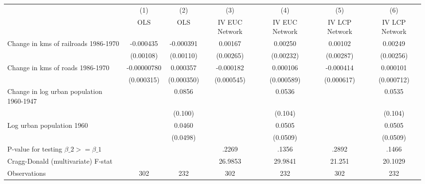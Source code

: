 {
\def\sym#1{\ifmmode^{#1}\else\(^{#1}\)\fi}
\begin{tabular}{l*{6}{c}}
\hline\hline
                &\multicolumn{1}{c}{(1)}&\multicolumn{1}{c}{(2)}&\multicolumn{1}{c}{(3)}&\multicolumn{1}{c}{(4)}&\multicolumn{1}{c}{(5)}&\multicolumn{1}{c}{(6)}\\
                &\multicolumn{1}{c}{OLS}&\multicolumn{1}{c}{OLS}&\multicolumn{1}{c}{IV EUC Network}&\multicolumn{1}{c}{IV EUC Network}&\multicolumn{1}{c}{IV LCP Network}&\multicolumn{1}{c}{IV LCP Network}\\
\hline
Change in kms of railroads 1986-1970&-0.000435         &-0.000391         &  0.00167         &  0.00250         &  0.00102         &  0.00249         \\
                &(0.00108)         &(0.00110)         &(0.00265)         &(0.00232)         &(0.00287)         &(0.00256)         \\
[1em]
Change in kms of roads 1986-1970&-0.00000780         & 0.000357         &-0.000182         & 0.000106         &-0.000414         & 0.000101         \\
                &(0.000315)         &(0.000350)         &(0.000545)         &(0.000589)         &(0.000617)         &(0.000712)         \\
[1em]
Change in log urban population 1960-1947&                  &   0.0856         &                  &   0.0536         &                  &   0.0535         \\
                &                  &  (0.100)         &                  &  (0.104)         &                  &  (0.104)         \\
[1em]
Log urban population 1960&                  &   0.0460         &                  &   0.0505         &                  &   0.0505         \\
                &                  & (0.0498)         &                  & (0.0509)         &                  & (0.0509)         \\
\hline
P-value for testing $\beta\_{2} >= \beta\_{1}$&                  &                  &    .2269         &    .1356         &    .2892         &    .1466         \\
Cragg-Donald (multivariate) F-stat&                  &                  &  26.9853         &  29.9841         &   21.251         &  20.1029         \\
Observations    &      302         &      232         &      302         &      232         &      302         &      232         \\
\hline\hline
\end{tabular}
}
